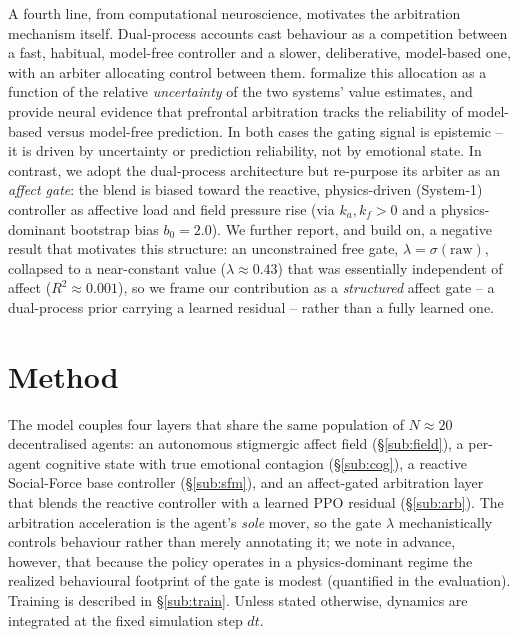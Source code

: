 \documentclass[sigconf,nonacm]{acmart}
\begin{document}
A fourth line, from computational neuroscience, motivates the arbitration mechanism itself. Dual-process accounts cast behaviour as a competition between a fast, habitual, model-free controller and a slower, deliberative, model-based one, with an arbiter allocating control between them. \citet{daw2005} formalize this allocation as a function of the relative \emph{uncertainty} of the two systems' value estimates, and \citet{lee2014} provide neural evidence that prefrontal arbitration tracks the reliability of model-based versus model-free prediction. In both cases the gating signal is epistemic -- it is driven by uncertainty or prediction reliability, not by emotional state. In contrast, we adopt the dual-process architecture but re-purpose its arbiter as an \emph{affect gate}: the blend is biased toward the reactive, physics-driven (System-1) controller as affective load and field pressure rise (via $k_a, k_f > 0$ and a physics-dominant bootstrap bias $b_0 = 2.0$). We further report, and build on, a negative result that motivates this structure: an unconstrained free gate, $\lambda = \sigma(\text{raw})$, collapsed to a near-constant value ($\lambda \approx 0.43$) that was essentially independent of affect ($R^2 \approx 0.001$), so we frame our contribution as a \emph{structured} affect gate -- a dual-process prior carrying a learned residual -- rather than a fully learned one.

\section{Method}
The model couples four layers that share the same population of $N\!\approx\!20$ decentralised agents: an autonomous stigmergic affect field (\S\ref{sub:field}), a per-agent cognitive state with true emotional contagion (\S\ref{sub:cog}), a reactive Social-Force base controller (\S\ref{sub:sfm}), and an affect-gated arbitration layer that blends the reactive controller with a learned PPO residual (\S\ref{sub:arb}). The arbitration acceleration is the agent's \emph{sole} mover, so the gate $\lambda$ mechanistically controls behaviour rather than merely annotating it; we note in advance, however, that because the policy operates in a physics-dominant regime the realized behavioural footprint of the gate is modest (quantified in the evaluation). Training is described in \S\ref{sub:train}. Unless stated otherwise, dynamics are integrated at the fixed simulation step $dt$.
\end{document}
